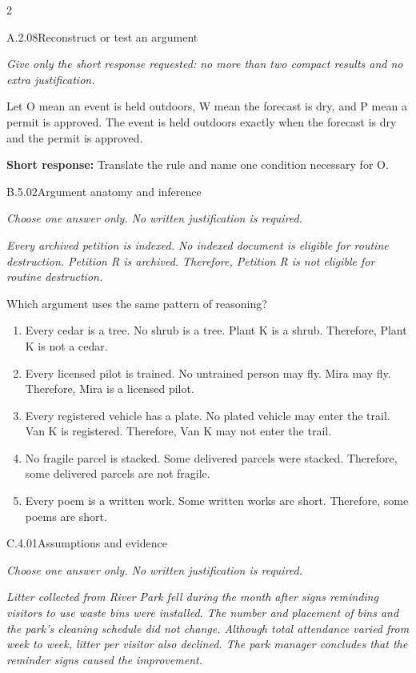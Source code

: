 \documentclass[9pt]{extarticle}
\newcommand{\choice}[1]{\item #1}
\begin{document}
\CoreWorkArea
\FormBreak
{}
\begin{multicols}{2}
\begin{DenseCoreProblem}{A.2.08}{Reconstruct or test an argument}
{\scriptsize\textit{Give only the short response requested: no more than two compact results and no extra justification.}\par}
Let O mean an event is held outdoors, W mean the forecast is dry, and P mean a permit is approved. The event is held outdoors exactly when the forecast is dry and the permit is approved.

\textbf{Short response:} Translate the rule and name one condition necessary for O.
\end{DenseCoreProblem}
\begin{DenseCoreProblem}{B.5.02}{Argument anatomy and inference}
{\scriptsize\textit{Choose one answer only. No written justification is required.}\par}
\emph{Every archived petition is indexed. No indexed document is eligible for routine destruction. Petition R is archived. Therefore, Petition R is not eligible for routine destruction.}

Which argument uses the same pattern of reasoning?
\begin{enumerate}[label=(\alph*)]
  \choice{Every cedar is a tree. No shrub is a tree. Plant K is a shrub. Therefore, Plant K is not a cedar.}
  \choice{Every licensed pilot is trained. No untrained person may fly. Mira may fly. Therefore, Mira is a licensed pilot.}
  \choice{Every registered vehicle has a plate. No plated vehicle may enter the trail. Van K is registered. Therefore, Van K may not enter the trail.}
  \choice{No fragile parcel is stacked. Some delivered parcels were stacked. Therefore, some delivered parcels are not fragile.}
  \choice{Every poem is a written work. Some written works are short. Therefore, some poems are short.}
\end{enumerate}
\end{DenseCoreProblem}
\columnbreak
\begin{DenseCoreProblem}{C.4.01}{Assumptions and evidence}
{\scriptsize\textit{Choose one answer only. No written justification is required.}\par}
\emph{Litter collected from River Park fell during the month after signs reminding visitors to use waste bins were installed. The number and placement of bins and the park's cleaning schedule did not change. Although total attendance varied from week to week, litter per visitor also declined. The park manager concludes that the reminder signs caused the improvement.}


\end{DenseCoreProblem}
\end{multicols}
\end{document}
